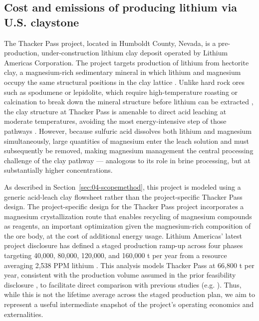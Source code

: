 \documentclass{article}
\renewcommand\_{\textunderscore\allowbreak}
\begin{document}
\subsection{Cost and emissions of producing lithium via U.S. claystone}\label{sec:04-thackerpass}

The Thacker Pass project, located in Humboldt County, Nevada, is a pre-production, under-construction lithium clay deposit operated by Lithium Americas Corporation. The project targets production of lithium from hectorite clay, a magnesium-rich sedimentary mineral in which lithium and magnesium occupy the same structural positions in the clay lattice \cite{castorLithiumRichClaystoneMcDermitt2020, zhaoRecentAdvancesLithium2023}. Unlike hard rock ores such as spodumene or lepidolite, which require high-temperature roasting or calcination to break down the mineral structure before lithium can be extracted \cite{gaoLithiumExtractionHard2023}, the clay structure at Thacker Pass is amenable to direct acid leaching at moderate temperatures, avoiding the most energy-intensive step of those pathways \cite{royLithiumClayAssessing2024}. However, because sulfuric acid dissolves both lithium and magnesium simultaneously, large quantities of magnesium enter the leach solution and must subsequently be removed, making magnesium management the central processing challenge of the clay pathway — analogous to its role in brine processing, but at substantially higher concentrations. 

As described in Section~\ref{sec:04-scopemethod}, this project is modeled using a generic acid-leach clay flowsheet rather than the project-specific Thacker Pass design. The project-specific design for the Thacker Pass project incorporates a magnesium crystallization route that enables recycling of magnesium compounds as reagents, an important optimization given the magnesium-rich composition of the ore body, at the cost of additional energy usage. Lithium Americas' latest project disclosure has defined a staged production ramp-up across four phases targeting 40,000, 80,000, 120,000, and 160,000 t  per year from a resource averaging 2,538 PPM lithium \cite{sgscanadaincSK1300Technical2024}. This analysis models Thacker Pass at 66,800 t  per year, consistent with the production volume assumed in the prior feasibility disclosure \cite{rothFeasibilityStudyNational2022}, to facilitate direct comparison with previous studies (e.g. \cite{wesselkaemperOptimizationProcessingCosts2025, royLithiumClayAssessing2024}). Thus, while this is not the lifetime average across the staged production plan, we aim to represent a useful intermediate snapshot of the project's operating economics and externalities.
\end{document}

